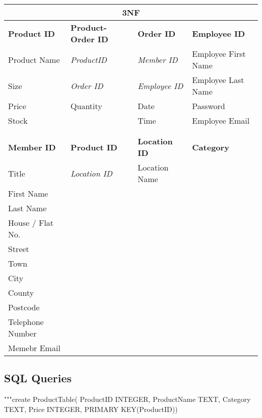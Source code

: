 \begin{center}
    \begin{tabular}{|p{3cm}|p{3cm}|p{3cm}|p{2cm}|}
        \hline
	 \multicolumn{4}{|c|}{3NF} \\ \hline
	\textbf{Product ID}  & \textbf{Product-Order ID} & \textbf{Order ID} & \textbf{Employee ID} \\ \hline
	{Product Name} & \textit{ProductID} & \textit{Member ID} & {Employee First Name} \\ \hline
	{Size} & \textit{Order ID} & \textit{Employee ID} & {Employee Last Name} \\ \hline
	{Price} & {Quantity} & {Date} & {Password} \\ \hline
	{Stock} & {} & {Time} & {Employee Email} \\ \hline
	{} & {} & {} & {}\\ \hline
	{} & {} & {} & {}\\ \hline
	\textbf{Member ID} & \textbf{Product ID} & \textbf{Location ID} & \textbf{Category}\\ \hline
	{Title} & \textit{Location ID} & {Location Name} & {}\\ \hline
	{First Name} & {} & {} & {}\\ \hline
	{Last Name} & {} & {} & {}\\ \hline
	{House / Flat No.} & {} & {} & {}\\ \hline
	{Street} & {} & {} & {}\\ \hline
	{Town} & {} & {} & {}\\ \hline
	{City} & {} & {} & {}\\ \hline
	{County} & {} & {} & {}\\ \hline
	{Postcode} & {} & {} & {}\\ \hline
	{Telephone Number} & {} & {} & {}\\ \hline
	{Memebr Email} & {} & {} & {}\\ \hline
    \end{tabular}
\end{center}

\subsection{SQL Queries}

\begin{sql}
"""create ProductTable(
 ProductID INTEGER,
 ProductName TEXT,
 Category TEXT,
 Price INTEGER,
 PRIMARY KEY(ProductID))
\end{sql}

